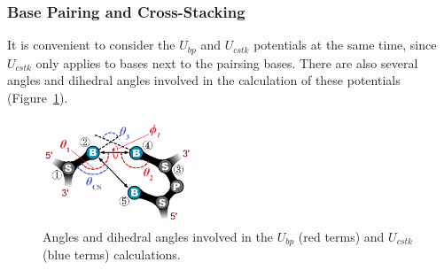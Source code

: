 \subsubsection{Base Pairing and Cross-Stacking}
\label{sec:dna_3spn2c_potential_bp_cstk}

It is convenient to consider the $U_{bp}$ and $U_{cstk}$ potentials at the same
time, since $U_{cstk}$ only applies to bases next to the pairsing bases.  There
are also several angles and dihedral angles involved in the calculation of these
potentials (Figure~\ref{fig:DNA_3spn2c_nonbonded_bp_cstk}).


\begin{figure}[ht]
  \centering
  \includegraphics[width=0.4\textwidth]{figures/DNA_3spn2c_nonbonded_bp_cstk.png}
  \caption{Angles and dihedral angles involved in the $U_{bp}$ (red terms) and
    $U_{cstk}$ (blue terms) calculations.}
  \label{fig:DNA_3spn2c_nonbonded_bp_cstk}
\end{figure}



